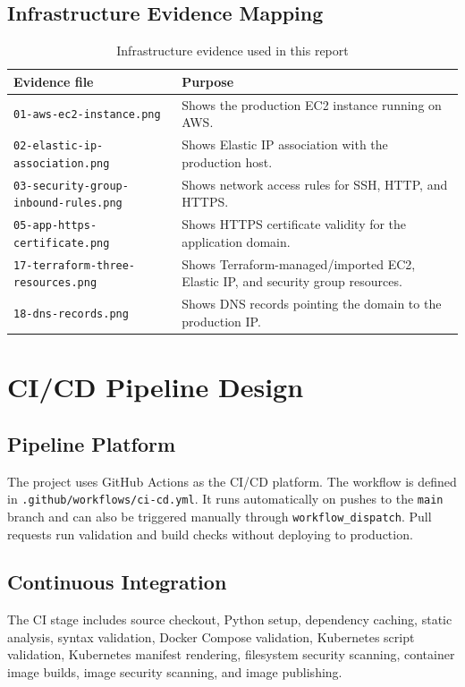 \documentclass[12pt,a4paper]{report}
\begin{document}
\section{Infrastructure Evidence Mapping}
\begin{table}[H]
\centering
\caption{Infrastructure evidence used in this report}
\begin{tabularx}{\textwidth}{p{} X}
\toprule
\textbf{Evidence file} & \textbf{Purpose} \\
\midrule
\texttt{01-aws-ec2-instance.png} & Shows the production EC2 instance running on AWS. \\
\texttt{02-elastic-ip-association.png} & Shows Elastic IP association with the production host. \\
\texttt{03-security-group-inbound-rules.png} & Shows network access rules for SSH, HTTP, and HTTPS. \\
\texttt{05-app-https-certificate.png} & Shows HTTPS certificate validity for the application domain. \\
\texttt{17-terraform-three-resources.png} & Shows Terraform-managed/imported EC2, Elastic IP, and security group resources. \\
\texttt{18-dns-records.png} & Shows DNS records pointing the domain to the production IP. \\
\bottomrule
\end{tabularx}
\end{table}

\chapter{CI/CD Pipeline Design}

\section{Pipeline Platform}
The project uses GitHub Actions as the CI/CD platform. The workflow is defined in \texttt{.github/workflows/ci-cd.yml}. It runs automatically on pushes to the \texttt{main} branch and can also be triggered manually through \texttt{workflow\_dispatch}. Pull requests run validation and build checks without deploying to production.

\section{Continuous Integration}
The CI stage includes source checkout, Python setup, dependency caching, static analysis, syntax validation, Docker Compose validation, Kubernetes script validation, Kubernetes manifest rendering, filesystem security scanning, container image builds, image security scanning, and image publishing.
\end{document}
